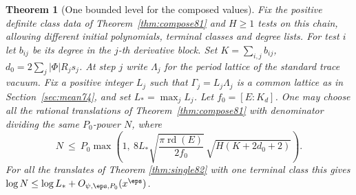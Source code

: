 \documentclass[a4paper,11pt]{article}
\newtheorem{theorem}[proposition]{Theorem}
\theoremstyle{definition}
\theoremstyle{remark}
\numberwithin{equation}{section}
\begin{document}
\begin{theorem}[One bounded level for the composed values]\label{thm:level85}
Fix the positive definite class data of Theorem~\ref{thm:compose81}
and \(H\ge1\) tests on this chain, allowing different initial
polynomials, terminal classes and degree lists. For test \(i\)
let \(b_{ij}\) be its degree in the \(j\)-th derivative block.
Set \(K=\sum_{i,j} b_{ij}\), \(d_0=2\sum_j|\Phi|R_js_j\).
At step \(j\) write \(\Lambda_j\) for the period lattice of the
standard trace vacuum. Fix a positive integer \(L_j\) such that
\(\Gamma_j=L_j\Lambda_j\) is a common lattice as in
Section~\ref{sec:mean74}, and set \(L_*=\max_j L_j\).
Let \(f_0=[E:K_d]\). One may choose all the rational translations
of Theorem~\ref{thm:compose81} with denominator dividing the
same \(P_0\)-power \(N\), where
\begin{equation}
 N\ \le\ P_0\max\left(1,\
       8L_*\sqrt{\frac{\pi\operatorname{rd}(E)}{2f_0}}\,
                         \sqrt{H(K+2d_0+2)}\right).            \label{eq:level85}
\end{equation}
For all the translates of
Theorem \ref{thm:single82}
with one terminal class this gives
\(\log N\le\log L_*+O_{\psi,\eps,P_0}(x^\eps)\).
\end{theorem}
\end{document}
